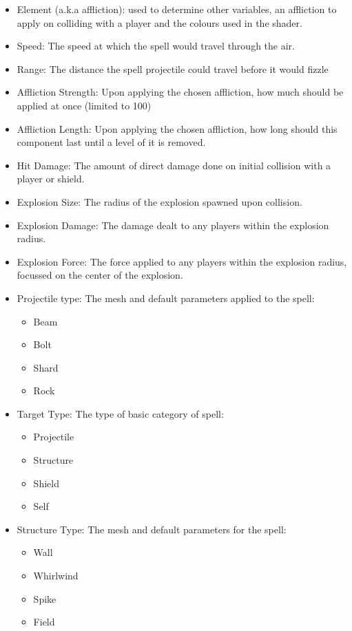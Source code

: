 \documentclass[12pt,a4paper]{report}
\begin{document}
\begin{itemize}
    \item Element (a.k.a affliction): used to determine other variables, an affliction to apply on colliding with a player and the colours used in the shader.
    \item Speed: The speed at which the spell would travel through the air.
    \item Range: The distance the spell projectile could travel before it would \gls{fizzle}
    \item Affliction Strength: Upon applying the chosen affliction, how much should be applied at once (limited to 100)
    \item Affliction Length: Upon applying the chosen affliction, how long should this component last until a level of it is removed.
    \item Hit Damage: The amount of direct damage done on initial collision with a player or shield.
    \item Explosion Size: The radius of the explosion spawned upon collision.
    \item Explosion Damage: The damage dealt to any players within the explosion radius.
    \item Explosion Force: The force applied to any players within the explosion radius, focussed on the center of the explosion.
    \item Projectile type: The mesh and default parameters applied to the spell:
          \begin{itemize}
              \item Beam
              \item Bolt
              \item Shard
              \item Rock
          \end{itemize}
    \item Target Type: The type of basic category of spell:
          \begin{itemize}
              \item Projectile
		\item Structure
              \item Shield
              \item Self
          \end{itemize}
	\item Structure Type: The mesh and default parameters for the spell:
		\begin{itemize}
			\item Wall
			\item Whirlwind
			\item Spike
			\item Field
		\end{itemize}
\end{itemize}
\end{document}
